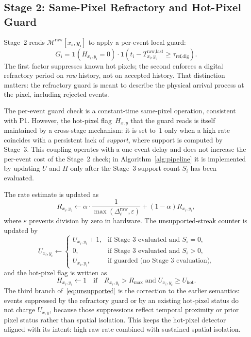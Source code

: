 \documentclass[a4paper,fleqn]{cas-dc}
\newcommand{\ind}[1]{\mathbf{1}\!\left(#1\right)}
\begin{document}
\subsection{Stage 2: Same-Pixel Refractory and Hot-Pixel Guard}
\label{sec:refractory}

Stage~2 reads $\mathcal{M}^{\text{raw}}[x_i,y_i]$ to apply a per-event local guard:
\begin{equation}
G_i = \ind{H_{x_i,y_i}=0}\cdot\ind{t_i - T_{x_i,y_i}^{\text{raw,last}} \geq \tau_{\text{ref,dig}}}.
\label{eq:guard}
\end{equation}
The first factor suppresses known hot pixels; the second enforces a digital refractory period on \emph{raw} history, not on accepted history. That distinction matters: the refractory guard is meant to describe the physical arrival process at the pixel, including rejected events.

The per-event guard check is a constant-time same-pixel operation, consistent with P1. However, the hot-pixel flag~$H_{x,y}$ that the guard reads is itself maintained by a cross-stage mechanism: it is set to~$1$ only when a high rate coincides with a persistent lack of \emph{support}, where support is computed by Stage~3. This coupling operates with a one-event delay and does not increase the per-event cost of the Stage~2 check; in Algorithm~\ref{alg:pipeline} it is implemented by updating $U$ and $H$ only after the Stage~3 support count $S_i$ has been evaluated.

The rate estimate is updated as
\begin{equation}
R_{x_i,y_i} \leftarrow \alpha \cdot \frac{1}{\max(\Delta_i^{\text{raw}},\varepsilon)} + (1-\alpha)R_{x_i,y_i},
\label{eq:rate}
\end{equation}
where $\varepsilon$ prevents division by zero in hardware. The unsupported-streak counter is updated by
\begin{equation}
U_{x_i,y_i} \leftarrow
\begin{cases}
U_{x_i,y_i}+1, & \text{if Stage~3 evaluated and } S_i = 0,\\
0, & \text{if Stage~3 evaluated and } S_i > 0,\\
U_{x_i,y_i}, & \text{if guarded (no Stage~3 evaluation)},
\end{cases}
\label{eq:unsupported}
\end{equation}
and the hot-pixel flag is written as
\begin{equation}
H_{x_i,y_i} \gets 1
\quad \text{if} \quad
R_{x_i,y_i} > R_{\max}
\;\text{and}\;
U_{x_i,y_i} \geq U_{\text{hot}}.
\label{eq:hotpixel}
\end{equation}
The third branch of~\eqref{eq:unsupported} is the correction to the earlier semantics: events suppressed by the refractory guard or by an existing hot-pixel status do not charge $U_{x,y}$, because those suppressions reflect temporal proximity or prior pixel status rather than spatial isolation. This keeps the hot-pixel detector aligned with its intent: high raw rate combined with sustained spatial isolation.
\end{document}
